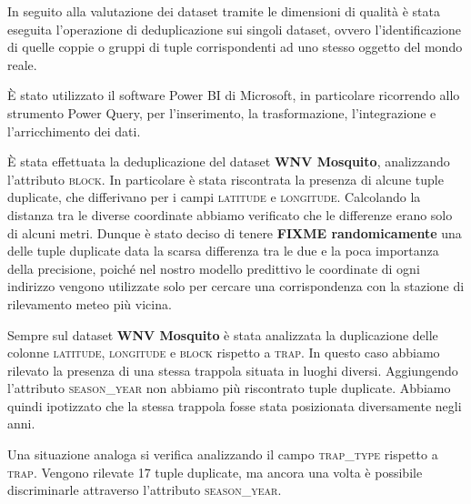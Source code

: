In seguito alla valutazione dei dataset tramite le dimensioni di qualità è 
stata eseguita l'operazione di deduplicazione sui singoli dataset, ovvero 
l'identificazione di quelle coppie o gruppi di tuple corrispondenti ad uno 
stesso oggetto del mondo reale.

È stato utilizzato il software Power BI di Microsoft, 
in particolare ricorrendo allo strumento Power Query, per l'inserimento, la 
trasformazione, l'integrazione e l'arricchimento dei dati.

È stata effettuata la deduplicazione del dataset \textbf{WNV Mosquito}, 
analizzando l'attributo \textsc{block}. In particolare è stata riscontrata 
la presenza di alcune tuple duplicate, che differivano per i campi 
\textsc{latitude} e \textsc{longitude}. Calcolando la distanza tra le diverse 
coordinate abbiamo verificato che le differenze erano solo di alcuni metri.
Dunque è stato deciso di tenere \textbf{FIXME randomicamente} una delle tuple 
duplicate data la scarsa differenza tra le due e la poca importanza della 
precisione, poiché nel nostro modello predittivo le coordinate di ogni 
indirizzo vengono utilizzate solo per cercare una corrispondenza con la 
stazione di rilevamento meteo più vicina.

Sempre sul dataset \textbf{WNV Mosquito} è stata analizzata la duplicazione 
delle colonne \textsc{latitude}, \textsc{longitude} e \textsc{block} rispetto a 
\textsc{trap}. In questo caso abbiamo rilevato la presenza di una stessa 
trappola situata in luoghi diversi. Aggiungendo l'attributo 
\textsc{season\_year} non abbiamo più riscontrato tuple duplicate. Abbiamo 
quindi ipotizzato che la stessa trappola fosse stata posizionata diversamente 
negli anni.

Una situazione analoga si verifica analizzando il campo \textsc{trap\_type} 
rispetto a \textsc{trap}. Vengono rilevate 17 tuple duplicate, ma ancora una 
volta è possibile discriminarle attraverso l'attributo \textsc{season\_year}.
